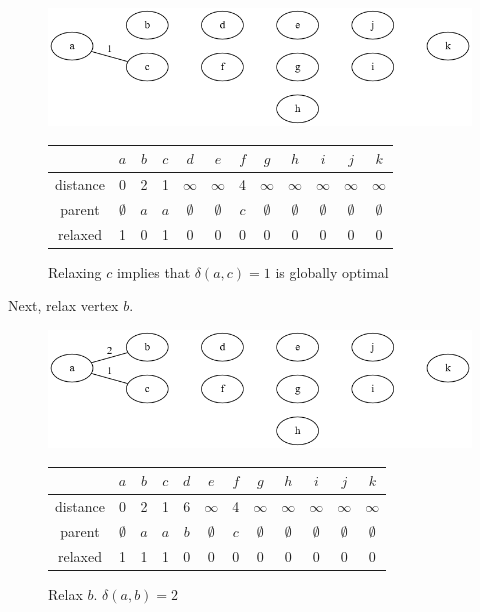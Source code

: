 \documentclass{book}
\begin{document}
\begin{figure}[H]
\centering
\includegraphics[width=.75\textwidth]{ch-dijkstra/spf2}
  \begin{tabular}{ | c | c | c | c | c | c | c | c | c | c | c | c | }
  \hline
   & $a$ & $b$ & $c$ & $d$ & $e$ & $f$ & $g$ & $h$ & $i$ & $j$ & $k$ \\
   \hline
   distance & 0 & 2 & 1 & $\infty$ & $\infty$ & 4 & $\infty$ & $\infty$ & $\infty$ & $\infty$ & $\infty$ \\
   \hline
   parent & $\emptyset$ & $a$ & $a$ & $\emptyset$ & $\emptyset$ & $c$ & $\emptyset$ & $\emptyset$ & $\emptyset$ & $\emptyset$ & $\emptyset$ \\
   \hline
   relaxed & 1 & 0 & 1 & 0 & 0 & 0 & 0 & 0 & 0 & 0 & 0 \\
   \hline
  \end{tabular}
\caption{Relaxing $c$ implies that $\delta(a,c)=1$ is globally optimal}
\label{spf2}
\end{figure}

Next, relax vertex $b$.

\begin{figure}[H]
\centering
\includegraphics[width=.75\textwidth]{ch-dijkstra/spf3}
  \begin{tabular}{ | c | c | c | c | c | c | c | c | c | c | c | c | }
  \hline
   & $a$ & $b$ & $c$ & $d$ & $e$ & $f$ & $g$ & $h$ & $i$ & $j$ & $k$ \\
   \hline
   distance & 0 & 2 & 1 & 6 & $\infty$ & 4 & $\infty$ & $\infty$ & $\infty$ & $\infty$ & $\infty$ \\
   \hline
   parent & $\emptyset$ & $a$ & $a$ & $b$ & $\emptyset$ & $c$ & $\emptyset$ & $\emptyset$ & $\emptyset$ & $\emptyset$ & $\emptyset$ \\
   \hline
   relaxed & 1 & 1 & 1 & 0 & 0 & 0 & 0 & 0 & 0 & 0 & 0 \\
   \hline
  \end{tabular}
\caption{Relax $b$. $\delta(a,b)=2$}
\label{spf3}
\end{figure}
\end{document}
